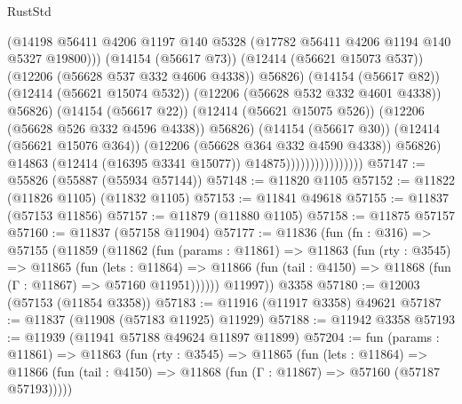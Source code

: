 \begin{lexlean}{RustStd}
\begin{coremodule}
                                              (@14198
                                                @56411
                                                @4206
                                                @1197
                                                @140
                                                @5328
                                                (@17782 @56411 @4206 @1194 @140 @5327 @19800)))
                                            (@14154 (@56617 @73))
                                            (@12414 (@56621 @15073 @537))
                                            (@12206 (@56628 @537 @332 @4606 @4338))
                                            @56826)
                                          (@14154 (@56617 @82))
                                          (@12414 (@56621 @15074 @532))
                                          (@12206 (@56628 @532 @332 @4601 @4338))
                                          @56826)
                                        (@14154 (@56617 @22))
                                        (@12414 (@56621 @15075 @526))
                                        (@12206 (@56628 @526 @332 @4596 @4338))
                                        @56826)
                                      (@14154 (@56617 @30))
                                      (@12414 (@56621 @15076 @364))
                                      (@12206 (@56628 @364 @332 @4590 @4338))
                                      @56826)
                                    @14863
                                    (@12414 (@16395 @3341 @15077))
                                    @14875))))))))))))))))
@57147 := @55826 (@55887 (@55934 @57144))
@57148 := @11820 @1105
@57152 := @11822 (@11826 @1105) (@11832 @1105)
@57153 := @11841 @49618
@57155 := @11837 (@57153 @11856)
@57157 := @11879 (@11880 @1105)
@57158 := @11875 @57157
@57160 := @11837 (@57158 @11904)
@57177 := @11836
    (fun (fn : @316) =>
    @57155
      (@11859
        (@11862
          (fun (params : @11861) =>
          @11863
            (fun (rty : @3545) =>
            @11865
              (fun (lets : @11864) =>
              @11866 (fun (tail : @4150) => @11868 (fun (Γ : @11867) => @57160 @11951))))))
        @11997))
    @3358
@57180 := @12003 (@57153 (@11854 @3358))
@57183 := @11916 (@11917 @3358) @49621
@57187 := @11837 (@11908 (@57183 @11925) @11929)
@57188 := @11942 @3358
@57193 := @11939 (@11941 @57188 @49624 @11897 @11899)
@57204 := fun (params : @11861) =>
  @11863
    (fun (rty : @3545) =>
    @11865
      (fun (lets : @11864) =>
      @11866 (fun (tail : @4150) => @11868 (fun (Γ : @11867) => @57160 (@57187 @57193)))))

\end{coremodule}
\end{lexlean}
